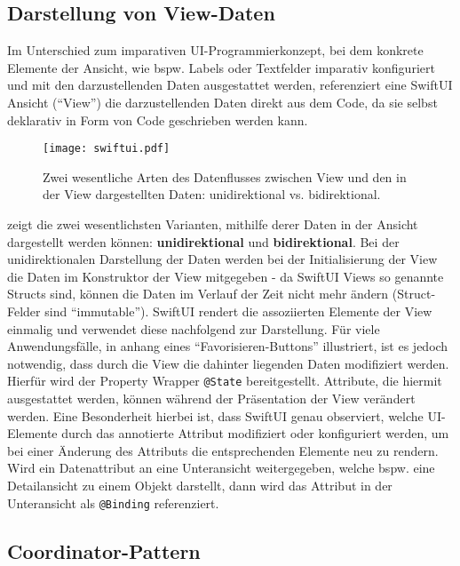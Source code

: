 \subsection{Darstellung von View-Daten}

Im Unterschied zum imparativen UI-Programmierkonzept, bei dem konkrete Elemente der Ansicht, wie bspw. Labels oder Textfelder imparativ konfiguriert und mit den darzustellenden Daten ausgestattet werden, referenziert eine SwiftUI Ansicht (\enquote{View}) die darzustellenden Daten direkt aus dem Code, da sie selbst deklarativ in Form von Code geschrieben werden kann.

\begin{figure}[H]
\texttt{[image: swiftui.pdf]}
\caption{Zwei wesentliche Arten des Datenflusses zwischen View und den in der View dargestellten Daten: unidirektional vs. bidirektional.}\label{fig:swiftui}
\end{figure}

\noindent {} zeigt die zwei wesentlichsten Varianten, mithilfe derer Daten in der Ansicht dargestellt werden können: \textbf{unidirektional} und \textbf{bidirektional}. Bei der unidirektionalen Darstellung der Daten werden bei der Initialisierung der View die Daten im Konstruktor der View mitgegeben - da SwiftUI Views so genannte Structs sind, können die Daten im Verlauf der Zeit nicht mehr ändern (Struct-Felder sind \enquote{immutable}). SwiftUI rendert die assoziierten Elemente der View einmalig und verwendet diese nachfolgend zur Darstellung. Für viele Anwendungsfälle, in  anhang eines \enquote{Favorisieren-Buttons} illustriert, ist es jedoch notwendig, dass durch die View die dahinter liegenden Daten modifiziert werden. Hierfür wird der Property Wrapper \texttt{@State} bereitgestellt. Attribute, die hiermit ausgestattet werden, können während der Präsentation der View verändert werden. Eine Besonderheit hierbei ist, dass SwiftUI genau observiert, welche UI-Elemente durch das annotierte Attribut modifiziert oder konfiguriert werden, um bei einer Änderung des Attributs die entsprechenden Elemente neu zu rendern. Wird ein Datenattribut an eine Unteransicht weitergegeben, welche bspw. eine Detailansicht zu einem Objekt darstellt, dann wird das Attribut in der Unteransicht als \texttt{@Binding} referenziert.

\subsection{Coordinator-Pattern}

